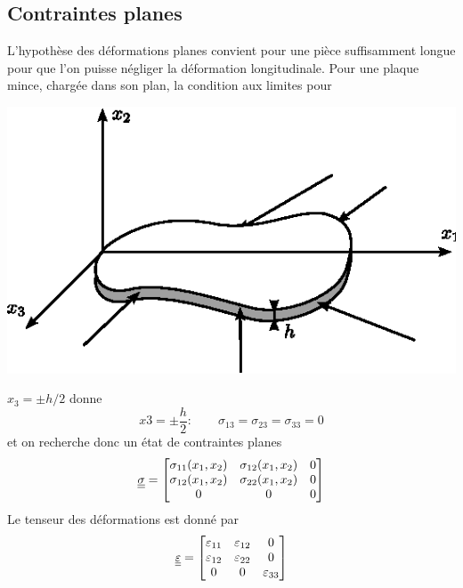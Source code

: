 \subsection{Contraintes planes}\label{ssec:Ch08-1.2}
L'hypothèse des déformations planes convient pour une pièce suffisamment longue pour que l'on puisse négliger la déformation longitudinale. 
Pour une plaque mince, chargée dans son plan, la condition aux limites pour 
\begin{center}
    \includegraphics{../images/T1_Ch08-01}
\end{center}
$x_3=\pm h/2$ donne 
\begin{equation}
  x3 = \pm \frac{h}{2} : \qquad \sigma_{13}=\sigma_{23}=\sigma_{33}=0
\label{eq:Ch08-014}
\end{equation}
et on recherche donc un état de contraintes planes 
\begin{equation}
  \underline{\underline{\sigma}}=\begin{bmatrix}
     \sigma_{11}(x_1,x_2) & \sigma_{12}(x_1,x_2) & 0 \\
     \sigma_{12}(x_1,x_2) & \sigma_{22}(x_1,x_2) & 0 \\
      0                   &  0                   & 0 
   \end{bmatrix}
\label{eq:Ch08-015}
\end{equation}
Le tenseur des déformations est donné par
\begin{equation}
  \underline{\underline{\varepsilon}} = \begin{bmatrix}
     \varepsilon_{11} & \varepsilon_{12} & 0           \\
     \varepsilon_{12} & \varepsilon_{22} & 0           \\
      0               &  0               & \varepsilon_{33} 
   \end{bmatrix}
\label{eq:Ch08-016}
\end{equation}
